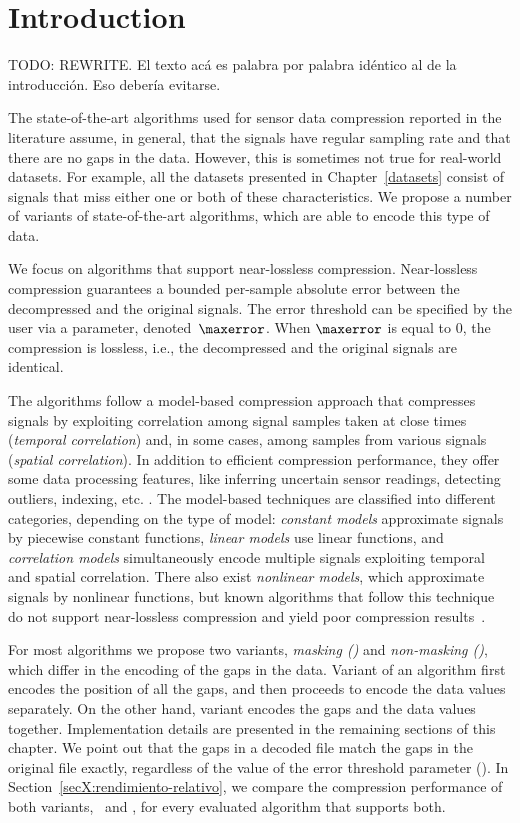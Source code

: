 

\section{Introduction}
\label{algo:overview}

TODO: REWRITE. El texto acá es palabra por palabra idéntico al de la introducción. Eso debería evitarse.

The state-of-the-art algorithms used for sensor data compression reported in the literature \cite{AnEva2013, Signal2016} assume, in general, that the signals have regular sampling rate and that there are no gaps in the data. However, this is sometimes not true for real-world datasets. For example, all the datasets presented in Chapter~\ref{datasets} consist of signals that miss either one or both of these characteristics. We propose a number of variants of state-of-the-art algorithms, which are able to encode this type of data. 


We focus on algorithms that support near-lossless compression. Near-lossless compression guarantees a bounded per-sample absolute error between the decompressed and the original signals. The error threshold can be specified by the user via a parameter, denoted~$\maxerror$. When $\maxerror$ is equal to 0, the compression is lossless, i.e., the decompressed and the original signals are identical.


The algorithms follow a model-based compression approach that compresses signals by exploiting correlation among signal samples taken at close times (\textit{temporal correlation}) and, in some cases, among samples from various signals (\textit{spatial correlation}). In addition to efficient compression performance, they offer some data processing features, like inferring uncertain sensor readings, detecting outliers, indexing, etc. \cite{AnEva2013}. The model-based techniques are classified into different categories, depending on the type of model: \textit{constant models} approximate signals by piecewise constant functions, \textit{linear models} use linear functions, and \textit{correlation models} simultaneously encode multiple signals exploiting temporal and spatial correlation. There also exist \textit{nonlinear models}, which approximate signals by nonlinear functions, but known algorithms that follow this technique do not support near-lossless compression and yield poor compression results~\cite{AnEva2013}. 


For most algorithms we propose two variants, \textit{masking (\maskalgo)} and \textit{non-masking (\NOmaskalgo)}, which differ in the encoding of the gaps in the data. Variant \maskalgo of an algorithm first encodes the position of all the gaps, and then proceeds to encode the data values separately. On the other hand, variant \NOmaskalgo encodes the gaps and the data values together. Implementation details are presented in the remaining sections of this chapter. We point out that the gaps in a decoded file match the gaps in the original file exactly, regardless of the value of the error threshold parameter (\maxerror). In Section~\ref{secX:rendimiento-relativo}, we compare the compression performance of both variants, \maskalgo\ and \NOmaskalgo, for every evaluated algorithm that supports both.


